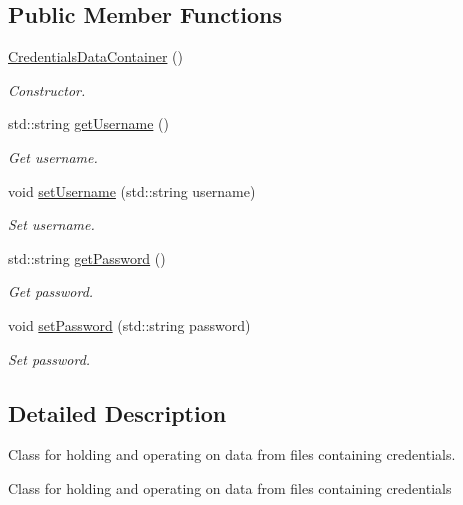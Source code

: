\subsection*{Public Member Functions}
\begin{DoxyCompactItemize}
\item 
\mbox{\hyperlink{classCredentialsDataContainer_af8084512db1e929dcb756db01bc3878c}{Credentials\+Data\+Container}} ()
\begin{DoxyCompactList}\small\item\em Constructor. \end{DoxyCompactList}\item 
std\+::string \mbox{\hyperlink{classCredentialsDataContainer_ac1a540945e9071df0d400df5f2c79c06}{get\+Username}} ()
\begin{DoxyCompactList}\small\item\em Get username. \end{DoxyCompactList}\item 
void \mbox{\hyperlink{classCredentialsDataContainer_af40a1051ec6b24efa275b6555c7a7386}{set\+Username}} (std\+::string username)
\begin{DoxyCompactList}\small\item\em Set username. \end{DoxyCompactList}\item 
std\+::string \mbox{\hyperlink{classCredentialsDataContainer_a47d225065285460882d1b996558109d4}{get\+Password}} ()
\begin{DoxyCompactList}\small\item\em Get password. \end{DoxyCompactList}\item 
void \mbox{\hyperlink{classCredentialsDataContainer_a73bf6ee1097d89c197e1da4b2d7797af}{set\+Password}} (std\+::string password)
\begin{DoxyCompactList}\small\item\em Set password. \end{DoxyCompactList}\end{DoxyCompactItemize}


\subsection{Detailed Description}
Class for holding and operating on data from files containing credentials. 

Class for holding and operating on data from files containing credentials 

